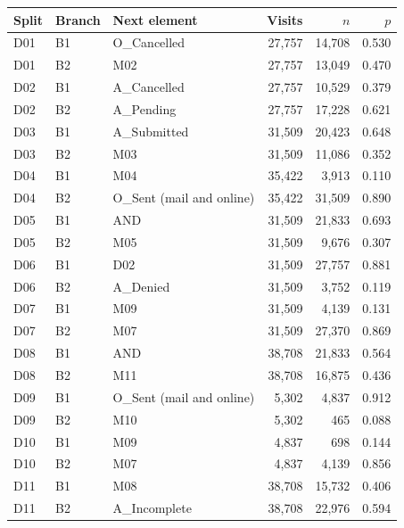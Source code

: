 \begin{tabular}{llp{}rrr}
\hline
Split & Branch & Next element & Visits & $n$ & $p$ \\
\hline
D01 & B1 & O\_Cancelled & 27,757 & 14,708 & 0.530 \\
D01 & B2 & M02 & 27,757 & 13,049 & 0.470 \\
D02 & B1 & A\_Cancelled & 27,757 & 10,529 & 0.379 \\
D02 & B2 & A\_Pending & 27,757 & 17,228 & 0.621 \\
D03 & B1 & A\_Submitted & 31,509 & 20,423 & 0.648 \\
D03 & B2 & M03 & 31,509 & 11,086 & 0.352 \\
D04 & B1 & M04 & 35,422 & 3,913 & 0.110 \\
D04 & B2 & O\_Sent (mail and online) & 35,422 & 31,509 & 0.890 \\
D05 & B1 & AND & 31,509 & 21,833 & 0.693 \\
D05 & B2 & M05 & 31,509 & 9,676 & 0.307 \\
D06 & B1 & D02 & 31,509 & 27,757 & 0.881 \\
D06 & B2 & A\_Denied & 31,509 & 3,752 & 0.119 \\
D07 & B1 & M09 & 31,509 & 4,139 & 0.131 \\
D07 & B2 & M07 & 31,509 & 27,370 & 0.869 \\
D08 & B1 & AND & 38,708 & 21,833 & 0.564 \\
D08 & B2 & M11 & 38,708 & 16,875 & 0.436 \\
D09 & B1 & O\_Sent (mail and online) & 5,302 & 4,837 & 0.912 \\
D09 & B2 & M10 & 5,302 & 465 & 0.088 \\
D10 & B1 & M09 & 4,837 & 698 & 0.144 \\
D10 & B2 & M07 & 4,837 & 4,139 & 0.856 \\
D11 & B1 & M08 & 38,708 & 15,732 & 0.406 \\
D11 & B2 & A\_Incomplete & 38,708 & 22,976 & 0.594 \\
\hline
\end{tabular}
